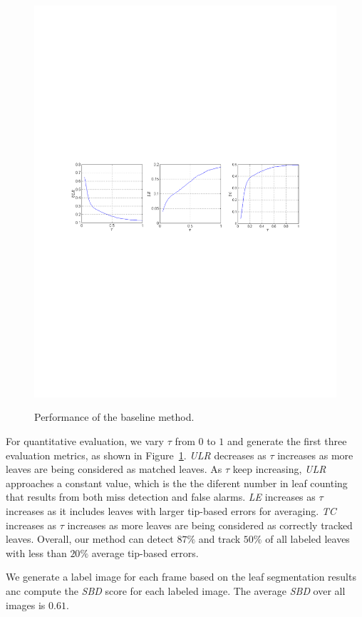 \begin{figure}
\centering
\includegraphics[width=.98\textwidth]{Figures/performance.pdf}\\
\caption{Performance of the baseline method.}
\label{fig:performance}
\end{figure}

For quantitative evaluation, we vary $\tau$ from $0$ to $1$ and generate the first three evaluation metrics, as shown in Figure~\ref{fig:performance}.
{\it{ULR}} decreases as $\tau$ increases as more leaves are being considered as matched leaves.
As $\tau$ keep increasing, {\it{ULR}} approaches a constant value, which is the the diferent number in leaf counting that results from both miss detection and false alarms.
{\it{LE}} increases as $\tau$ increases as it includes leaves with larger tip-based errors for averaging.
{\it{TC}} increases as $\tau$ increases as more leaves are being considered as correctly tracked leaves.
Overall, our method can detect $87\%$ and track $50\%$ of all labeled leaves with less than $20\%$ average tip-based errors.

We generate a label image for each frame based on the leaf segmentation results anc compute the {\it{SBD}} score for each labeled image.
The average {\it{SBD}} over all images is $0.61$.







